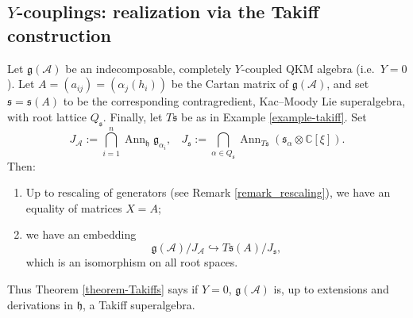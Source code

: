 \documentclass[12pt, a4paper, reqno]{amsart}
\def\C{\mathbb{C}}
\def\AA{\mathcal{A}}
\def\g{\mathfrak{g}}
\def\h{\mathfrak{h}}
\def\s{\mathfrak{s}}
\theoremstyle{definition}
\theoremstyle{definition}
\theoremstyle{definition}
\numberwithin{theorem}{section}
\numberwithin{lemma}{section}
\numberwithin{remark}{section}
\numberwithin{definition}{section}
\numberwithin{corollary}{section}
\numberwithin{proposition}{section}
\numberwithin{example}{section}
\begin{document}
	\subsection{$Y$-couplings: realization via the Takiff construction}
	
	\begin{theorem}\label{theorem-Takiffs}
		Let \(\mathfrak{g}(\mathcal{A})\) be an indecomposable, completely $Y$-coupled QKM algebra (i.e.~$Y=0$).
		Let \(A=(a_{ij})=(\alpha_j(h_i))\) be the Cartan matrix of \(\mathfrak{g}(\mathcal{A})\), and set \(\s=\mathfrak{s}(A)\) to be the corresponding contragredient, Kac--Moody Lie superalgebra, with root lattice $Q_{\s}$.  Finally, let  \(T\mathfrak{s}\) be as in Example \ref{example-takiff}. Set
		\[
		J_{\AA}:=\bigcap\limits_{i=1}^{n}\operatorname{Ann}_{\h}\g_{\alpha_i},  \ \ \ \ J_{\s}:=\bigcap\limits_{\alpha\in Q_{\s}}\operatorname{Ann}_{T\s}(\s_{\alpha}\otimes\C[\xi]).
		\] 
		Then:
		\begin{enumerate}
			\item Up to rescaling of generators (see Remark \ref{remark_rescaling}), we have an equality of matrices $X=A$;
			\item we have an embedding
			\[
			\mathfrak{g}(\mathcal{A})/J_\AA\hookrightarrow T\mathfrak{s}(A)/J_{\mathfrak{s}},
			\]
			which is an isomorphism on all root spaces.
		\end{enumerate}
	\end{theorem}
	
	Thus Theorem \ref{theorem-Takiffs} says if $Y=0$, $\g(\AA)$ is, up to extensions and derivations in $\h$, a Takiff superalgebra.
	
\end{document}
